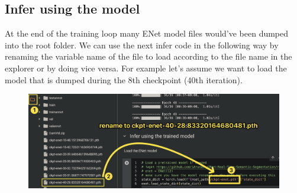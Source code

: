 \subsection*{Infer using the model}
At the end of the training loop many ENet model files would've been dumped into the root folder. We can use the next infer code in the following way by renaming the variable name of the file to load according to the file name in the explorer or by doing vice versa. For example let's assume we want to load the model that is dumped during the 8th checkpoint (40th iteration).
\begin{figure}[H]
	\centering
	\includegraphics[width=450pt]{assets/enet/camvid/loadenet.png}
	\label{fig:using:test2}
\end{figure}

